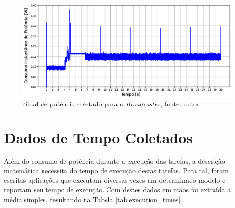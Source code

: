 \documentclass[a5paper]{ufsc-thesis}  %
\begin{document}
\begin{figure}[!ht]
    \centering
    \includegraphics[width=1\linewidth]{imagens/beacon5s.eps}
    \caption{Sinal de potência coletado para o \textit{Broadcaster}, fonte: autor}
    \label{fig:beacon5s}
\end{figure}

\section{Dados de Tempo Coletados}
Além do consumo de potência durante a execução das tarefas, a descrição matemática necessita do tempo de execução destas tarefas. Para tal, foram escritas aplicações que executam diversas vezes um determinado modelo e reportam seu tempo de execução. Com destes dados em mãos foi extraída a média simples, resultando na Tabela \ref{tab:execution_times}.
\end{document}
